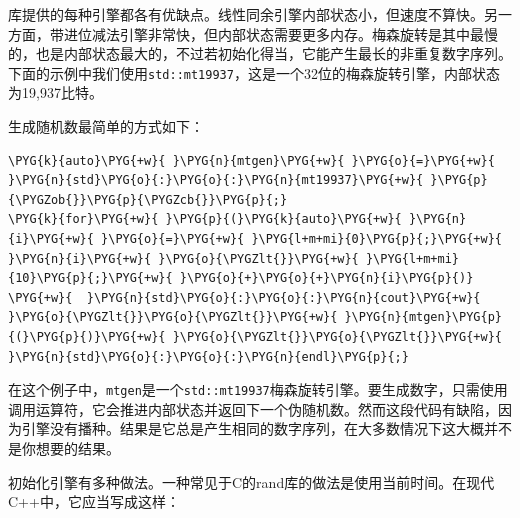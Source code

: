 
库提供的每种引擎都各有优缺点。线性同余引擎内部状态小，但速度不算快。另一方面，带进位减法引擎非常快，但内部状态需要更多内存。梅森旋转是其中最慢的，也是内部状态最大的，不过若初始化得当，它能产生最长的非重复数字序列。下面的示例中我们使用\texttt{std::\allowbreak{}mt19937}，这是一个32位的梅森旋转引擎，内部状态为19,937比特。



生成随机数最简单的方式如下：



\begin{codeblockbg}
\begin{Verbatim}[commandchars=\\\{\},breaklines=true,breakanywhere=true,fontsize=\codefont,xleftmargin=17bp]
\PYG{k}{auto}\PYG{+w}{ }\PYG{n}{mtgen}\PYG{+w}{ }\PYG{o}{=}\PYG{+w}{ }\PYG{n}{std}\PYG{o}{:}\PYG{o}{:}\PYG{n}{mt19937}\PYG{+w}{ }\PYG{p}{\PYGZob{}}\PYG{p}{\PYGZcb{}}\PYG{p}{;}
\PYG{k}{for}\PYG{+w}{ }\PYG{p}{(}\PYG{k}{auto}\PYG{+w}{ }\PYG{n}{i}\PYG{+w}{ }\PYG{o}{=}\PYG{+w}{ }\PYG{l+m+mi}{0}\PYG{p}{;}\PYG{+w}{ }\PYG{n}{i}\PYG{+w}{ }\PYG{o}{\PYGZlt{}}\PYG{+w}{ }\PYG{l+m+mi}{10}\PYG{p}{;}\PYG{+w}{ }\PYG{o}{+}\PYG{o}{+}\PYG{n}{i}\PYG{p}{)}
\PYG{+w}{  }\PYG{n}{std}\PYG{o}{:}\PYG{o}{:}\PYG{n}{cout}\PYG{+w}{ }\PYG{o}{\PYGZlt{}}\PYG{o}{\PYGZlt{}}\PYG{+w}{ }\PYG{n}{mtgen}\PYG{p}{(}\PYG{p}{)}\PYG{+w}{ }\PYG{o}{\PYGZlt{}}\PYG{o}{\PYGZlt{}}\PYG{+w}{ }\PYG{n}{std}\PYG{o}{:}\PYG{o}{:}\PYG{n}{endl}\PYG{p}{;}
\end{Verbatim}
\end{codeblockbg}



在这个例子中，\texttt{mtgen}是一个\texttt{std::\allowbreak{}mt19937}梅森旋转引擎。要生成数字，只需使用调用运算符，它会推进内部状态并返回下一个伪随机数。然而这段代码有缺陷，因为引擎没有播种。结果是它总是产生相同的数字序列，在大多数情况下这大概并不是你想要的结果。



初始化引擎有多种做法。一种常见于C的rand库的做法是使用当前时间。在现代C++中，它应当写成这样：



